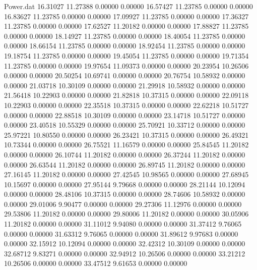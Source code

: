 \begin{filecontents}{Power.dat}
  16.31027   11.27388    0.00000    0.00000
  16.57427   11.23785    0.00000    0.00000
  16.83627   11.23785    0.00000    0.00000
  17.09927   11.23785    0.00000    0.00000
  17.36327   11.23785    0.00000    0.00000
  17.62527   11.20182    0.00000    0.00000
  17.88827   11.23785    0.00000    0.00000
  18.14927   11.23785    0.00000    0.00000
  18.40054   11.23785    0.00000    0.00000
  18.66154   11.23785    0.00000    0.00000
  18.92454   11.23785    0.00000    0.00000
  19.18754   11.23785    0.00000    0.00000
  19.45054   11.23785    0.00000    0.00000
  19.71354   11.23785    0.00000    0.00000
  19.97654   11.09373    0.00000    0.00000
  20.23954   10.26506    0.00000    0.00000
  20.50254   10.69741    0.00000    0.00000
  20.76754   10.58932    0.00000    0.00000
  21.03718   10.30109    0.00000    0.00000
  21.29918   10.58932    0.00000    0.00000
  21.56418   10.22903    0.00000    0.00000
  21.82818   10.37315    0.00000    0.00000
  22.09118   10.22903    0.00000    0.00000
  22.35518   10.37315    0.00000    0.00000
  22.62218   10.51727    0.00000    0.00000
  22.88518   10.30109    0.00000    0.00000
  23.14718   10.51727    0.00000    0.00000
  23.40518   10.55329    0.00000    0.00000
  25.70921   10.33712    0.00000    0.00000
  25.97221   10.80550    0.00000    0.00000
  26.23421   10.37315    0.00000    0.00000
  26.49321   10.73344    0.00000    0.00000
  26.75521   11.16579    0.00000    0.00000
  25.84545   11.20182    0.00000    0.00000
  26.10744   11.20182    0.00000    0.00000
  26.37244   11.20182    0.00000    0.00000
  26.63544   11.20182    0.00000    0.00000
  26.89745   11.20182    0.00000    0.00000
  27.16145   11.20182    0.00000    0.00000
  27.42545   10.98565    0.00000    0.00000
  27.68945   10.15697    0.00000    0.00000
  27.95144    9.79668    0.00000    0.00000
  28.21144   10.12094    0.00000    0.00000
  28.48106   10.37315    0.00000    0.00000
  28.74606   10.58932    0.00000    0.00000
  29.01006    9.90477    0.00000    0.00000
  29.27306   11.12976    0.00000    0.00000
  29.53806   11.20182    0.00000    0.00000
  29.80006   11.20182    0.00000    0.00000
  30.05906   11.20182    0.00000    0.00000
  31.11012    9.94080    0.00000    0.00000
  31.37412    9.76065    0.00000    0.00000
  31.63312    9.76065    0.00000    0.00000
  31.89612    9.97683    0.00000    0.00000
  32.15912   10.12094    0.00000    0.00000
  32.42312   10.30109    0.00000    0.00000
  32.68712    9.83271    0.00000    0.00000
  32.94912   10.26506    0.00000    0.00000
  33.21212   10.26506    0.00000    0.00000
  33.47512    9.61653    0.00000    0.00000

\end{filecontents}
